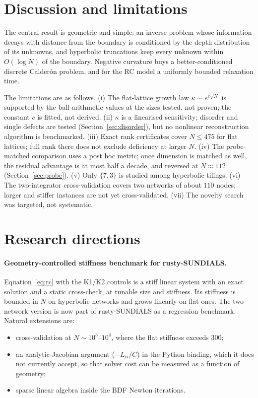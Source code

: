 \documentclass[11pt,a4paper]{article}
\begin{document}
\section{Discussion and limitations}

The central result is geometric and simple: an inverse problem whose information decays with distance from the
boundary is conditioned by the depth distribution of its unknowns, and hyperbolic truncations keep every unknown
within $O(\log N)$ of the boundary. Negative curvature buys a better-conditioned discrete Calder\'on problem, and
for the RC model a uniformly bounded relaxation time.

The limitations are as follows.
(i) The flat-lattice growth law $\kappa\sim e^{c\sqrt N}$ is supported by the ball-arithmetic values at the sizes
tested, not proven; the constant $c$ is fitted, not derived.
(ii) $\kappa$ is a linearised sensitivity; disorder and single defects are tested (Section~\ref{sec:disorder}),
but no nonlinear reconstruction algorithm is benchmarked.
(iii) Exact rank certificates cover $N\le475$ for flat lattices; full rank there does not exclude deficiency at
larger $N$.
(iv) The probe-matched comparison uses a post hoc metric; once dimension is matched as well, the residual
advantage is at most half a decade, and reversed at $N\approx112$ (Section~\ref{sec:probe}).
(v) Only $\{7,3\}$ is studied among hyperbolic tilings.
(vi) The two-integrator cross-validation covers two networks of about $110$ nodes; larger and stiffer instances
are not yet cross-validated.
(vii) The novelty search was targeted, not systematic.

\section{Research directions}

\paragraph{Geometry-controlled stiffness benchmark for rusty-SUNDIALS.} Equation~\eqref{eq:rc} with the K1/K2
controls is a stiff linear system with an exact solution and a static cross-check, at tunable size and stiffness.
Its stiffness is bounded in $N$ on hyperbolic networks and grows linearly on flat ones. The two-network version is
now part of rusty-SUNDIALS as a regression benchmark. Natural extensions are:
\begin{itemize}
\item cross-validation at $N\sim10^3$--$10^4$, where the flat stiffness exceeds $300$;
\item an analytic-Jacobian argument ($-L_{ii}/C$) in the Python binding, which it does not currently accept, so
that solver cost can be measured as a function of geometry;
\item sparse linear algebra inside the BDF Newton iterations.
\end{itemize}
\end{document}

